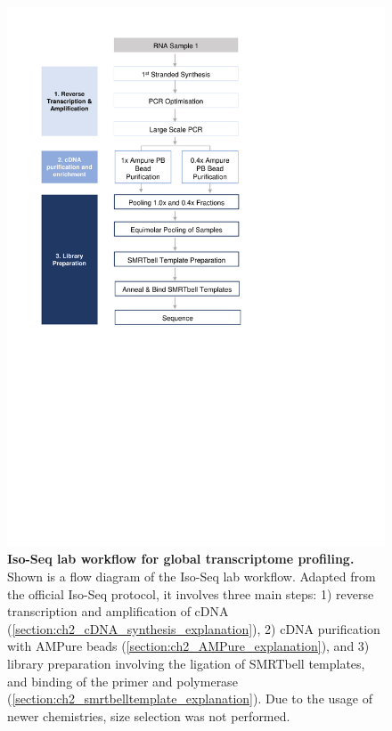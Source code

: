 \begin{figure}[htp]
	\includegraphics[page=1,trim={0 12cm 5cm 1cm},clip,scale = 1]{Figures/ProjectDevelopment_Figures.pdf}
	\captionsetup{width=0.95\textwidth}
	\caption[Iso-Seq lab workflow for global transcriptome profiling]%
	{\textbf{Iso-Seq lab workflow for global transcriptome profiling.} Shown is a flow diagram of the Iso-Seq lab workflow. Adapted from the official Iso-Seq protocol, it involves three main steps: 1) reverse transcription and amplification of cDNA (\cref{section:ch2_cDNA_synthesis_explanation}), 2) cDNA purification with AMPure beads (\cref{section:ch2_AMPure_explanation}), and 3) library preparation involving the ligation of SMRTbell templates, and binding of the primer and polymerase (\cref{section:ch2_smrtbelltemplate_explanation}). Due to the usage of newer chemistries, size selection was not performed.}
	\label{fig:isoseq_wholelab_protocol}
\end{figure}

